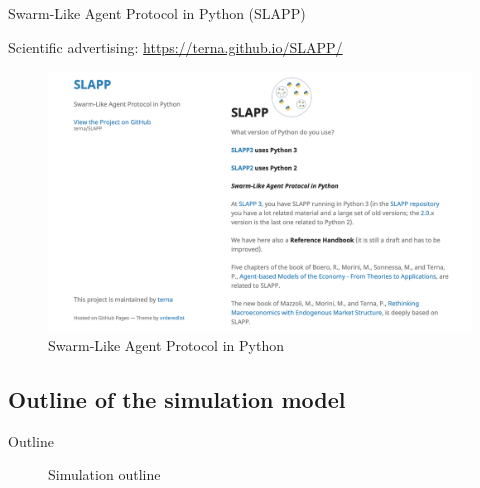 \documentclass[9pt]{beamer}
\begin{document}
\begin{frame}{Swarm-Like Agent Protocol in Python (SLAPP)}

Scientific advertising: \url{https://terna.github.io/SLAPP/}

\begin{figure}[H]
\center
\includegraphics[scale=0.26]{SLAPP.png}

\caption{Swarm-Like Agent Protocol in Python} 
\label{SLAPP}
\end{figure}


\end{frame}

\subsection{Outline of the simulation model}

\begin{frame}{Outline}

\begin{figure}[H]
\center
{}
\caption{Simulation outline}
\label{outline}
\end{figure}


\end{frame}
\end{document}
